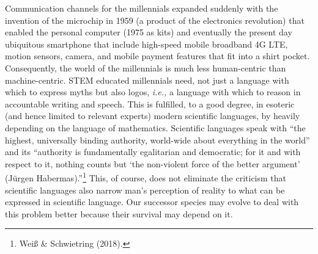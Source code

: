 \begin{multicols}{2}
Communication channels for the millennials expanded suddenly with the invention of the microchip in 1959 (a product of the electronics revolution) that enabled the personal computer (1975 as kits) and eventually the present day ubiquitous smartphone that include high-speed mobile broadband 4G LTE, motion sensors, camera, and mobile payment features that fit into a shirt pocket. Consequently, the world of the millennials is much less human-centric than machine-centric. STEM educated millennials need, not just a language with which to express myths but also logos, \textit{i.e.,} a language with which to reason in accountable writing and speech. This is fulfilled, to a good degree, in esoteric (and hence limited to relevant experts) modern scientific languages, by heavily depending on the language of mathematics. Scientific languages speak with “the highest, universally binding authority, world-wide about everything in the world” and its “authority is fundamentally egalitarian and democratic; for it and with respect to it, nothing counts but ‘the non-violent force of the better argument’ (Jürgen Habermas).”\footnote{Weiß \& Schwietring (2018).}  This, of course, does not eliminate the criticism that scientific languages also narrow man's perception of reality to what can be expressed in scientific language. Our successor species may evolve to deal with this problem better because their survival may depend on it.

\vskip 2pt


\end{multicols}
